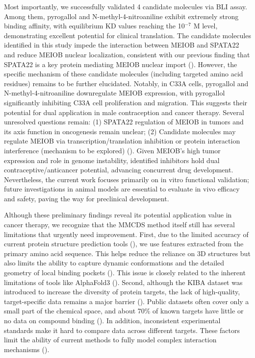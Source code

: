 \documentclass[unnumsec,webpdf,contemporary,large]{oup-authoring-template}%
\theoremstyle{thmstyleone}%
\theoremstyle{thmstyletwo}%
\theoremstyle{thmstylethree}%
\begin{document}
Most importantly, we successfully validated 4 candidate molecules via BLI assay. Among them, pyrogallol and N-methyl-4-nitroaniline exhibit extremely strong binding affinity, with equilibrium $\text{KD}$ values reaching the 10$^{-7}$ M level, demonstrating excellent potential for clinical translation. The candidate molecules identified in this study impede the interaction between MEIOB and SPATA22 and reduce MEIOB nuclear localization, consistent with our previous finding that SPATA22 is a key protein mediating MEIOB nuclear import (\citealt{10}). However, the specific mechanism of these candidate molecules (including targeted amino acid residues) remains to be further elucidated. Notably, in C33A cells, pyrogallol and N-methyl-4-nitroaniline downregulate MEIOB expression, with pyrogallol significantly inhibiting C33A cell proliferation and migration. This suggests their potential for dual application in male contraception and cancer therapy. Several unresolved questions remain: (1) SPATA22 regulation of MEIOB in tumors and its axis function in oncogenesis remain unclear; (2) Candidate molecules may regulate MEIOB via transcription/translation inhibition or protein interaction interference (mechanism to be explored) (\citealt{18}). Given MEIOB's high tumor expression and role in genome instability, identified inhibitors hold dual contraceptive/anticancer potential, advancing concurrent drug development. Nevertheless, the current work focuses primarily on in vitro functional validation; future investigations in animal models are essential to evaluate in vivo efficacy and safety, paving the way for preclinical development.

Although these preliminary findings reveal its potential application value in cancer therapy, we recognize that the MMCDS method itself still has several limitations that urgently need improvement. First, due to the limited accuracy of current protein structure prediction tools (\citealt{59,60}), we use features extracted from the primary amino acid sequence. This helps reduce the reliance on 3D structures but also limits the ability to capture dynamic conformations and the detailed geometry of local binding pockets (\citealt{61}). This issue is closely related to the inherent limitations of tools like AlphaFold3 (\citealt{62}). Second, although the KIBA dataset was introduced to increase the diversity of protein targets, the lack of high-quality, target-specific data remains a major barrier (\citealt{63,64}). Public datasets often cover only a small part of the chemical space, and about 70\% of known targets have little or no data on compound binding (\citealt{65}). In addition, inconsistent experimental standards make it hard to compare data across different targets. These factors limit the ability of current methods to fully model complex interaction mechanisms (\citealt{66}).
\end{document}
